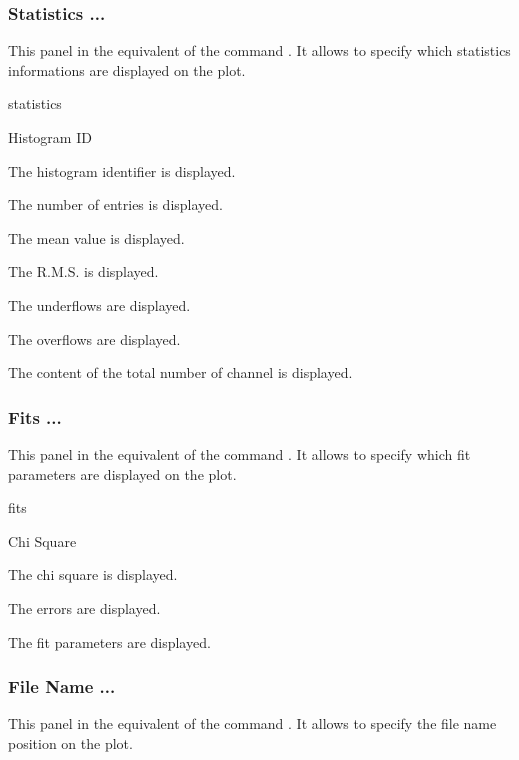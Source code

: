 \newpage

\subsubsection{Statistics ...}
This panel in the equivalent of the \XPAW{} command . It
allows to specify which statistics informations  are displayed on the plot.

\begin{PAWf}{statistics}
\begin{DLsf}{Histogram ID}
\item[Histogram ID] The histogram identifier is displayed.
\item[Entries]      The number of entries is displayed.
\item[Mean value]   The mean value is displayed.
\item[R.M.S.]       The R.M.S. is displayed.
\item[Underflows]   The underflows are displayed.
\item[Overflows]    The overflows are displayed.
\item[All channels] The content of the total number of channel is displayed.
\end{DLsf}
\end{PAWf}


\subsubsection{Fits ...}
This panel in the equivalent of the \XPAW{} command . It
allows to specify which fit parameters are displayed on the plot.

\begin{PAWf}{fits}
\begin{DLsf}{Chi Square}
\item[Chi Square]  The chi square is displayed.
\item[Errors]      The errors are displayed.
\item[Parameters]  The fit parameters are displayed.
\end{DLsf}
\end{PAWf}

\newpage

\subsubsection{File Name ...}
This panel in the equivalent of the \XPAW{} command . It
allows to specify the file name position on the plot.

